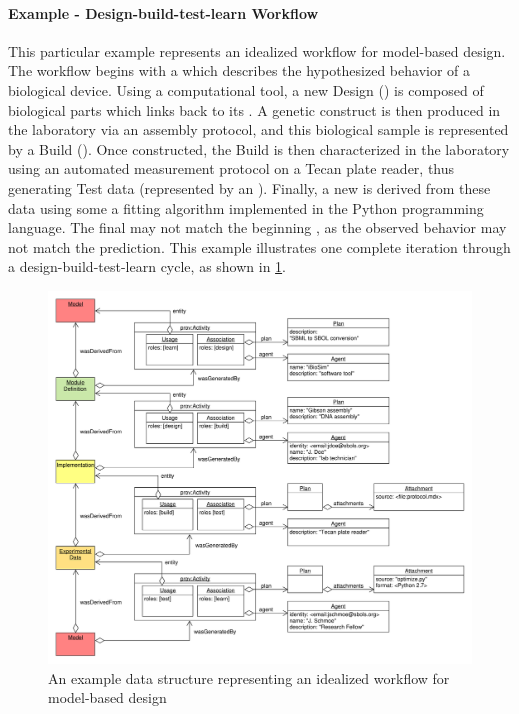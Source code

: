 \paragraph{Example - Design-build-test-learn Workflow}

This particular example represents an idealized workflow for model-based design. The workflow begins with a  which describes the hypothesized behavior of a biological device. Using a computational tool, a new Design () is composed of biological parts which links back to its . A genetic construct is then produced in the laboratory via an assembly protocol, and this biological sample is represented by a Build (). Once constructed, the Build is then characterized in the laboratory using an automated measurement protocol on a Tecan plate reader, thus generating Test data (represented by an ). Finally, a new  is derived from these data using some a fitting algorithm implemented in the Python programming language. The final  may not match the beginning , as the observed behavior may not match the prediction. This example illustrates one complete iteration through a design-build-test-learn cycle, as shown in \ref{images:design-build-test-learn}.


\begin{figure}[ht]
\begin{center}
\includegraphics[width=\linewidth]{uml/design-build-test}
\caption[]{An example data structure representing an idealized workflow for model-based
design}
\label{images:design-build-test-learn}
\end{center}
\end{figure}

